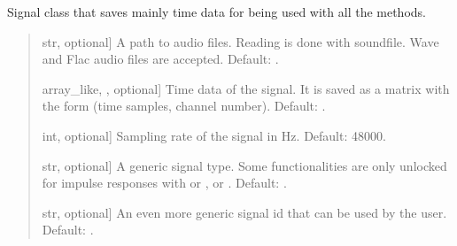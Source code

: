 \documentclass[letterpaper,10pt,english]{sphinxmanual}
\begin{document}
\begin{fulllineitems}
\begin{fulllineitems}
\label{\detokenize{classes:dsptools.classes.signal_class.Signal.__init__}}
\pysigstartsignatures
{}
\pysigstopsignatures
\sphinxAtStartPar
Signal class that saves mainly time data for being used with all the
methods.
\begin{quote}\begin{description}
\begin{description}
\sphinxlineitem{\sphinxstylestrong{path}}{[}str, optional{]}
\sphinxAtStartPar
A path to audio files. Reading is done with soundfile. Wave and
Flac audio files are accepted.
Default: .

\sphinxlineitem{\sphinxstylestrong{time\_data}}{[}array\_like, , optional{]}
\sphinxAtStartPar
Time data of the signal. It is saved as a matrix with the form
(time samples, channel number). Default: .

\sphinxlineitem{\sphinxstylestrong{sampling\_rate\_hz}}{[}int, optional{]}
\sphinxAtStartPar
Sampling rate of the signal in Hz. Default: 48000.

\sphinxlineitem{\sphinxstylestrong{signal\_type}}{[}str, optional{]}
\sphinxAtStartPar
A generic signal type. Some functionalities are only unlocked for
impulse responses with  or ,  or .
Default: .

\sphinxlineitem{\sphinxstylestrong{signal\_id}}{[}str, optional{]}
\sphinxAtStartPar
An even more generic signal id that can be used by the user.
Default: .


\end{description}
\end{description}
\end{quote}
\end{fulllineitems}
\end{fulllineitems}
\end{document}
